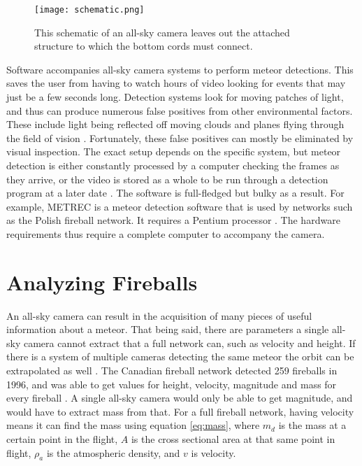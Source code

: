 \begin{figure}[ht!]
	\centering
	\texttt{[image: schematic.png]}
	\caption{This schematic of an all-sky camera leaves out the attached structure to which the bottom cords must connect\protect\cite{Bannister2012}.}
	\label{fig:schematic}
\end{figure}

Software accompanies all-sky camera systems to perform meteor detections. This saves the user from having to watch hours of video looking for events that may just be a few seconds long. Detection systems look for moving patches of light, and thus can produce numerous false positives from other environmental factors. These include light being reflected off moving clouds and planes flying through the field of vision \cite{Harbaugh2008}. Fortunately, these false positives can mostly be eliminated by visual inspection. The exact setup depends on the specific system, but meteor detection is either constantly processed by a computer checking the frames as they arrive, or the video is stored as a whole to be run through a detection program at a later date \cite{Molau2005}. The software is full-fledged but bulky as a result. For example, METREC is a meteor detection software that is used by networks such as the Polish fireball network. It requires a Pentium processor \cite{Molau2005}. The hardware requirements thus require a complete computer to accompany the camera.  

\section{Analyzing Fireballs}

An all-sky camera can result in the acquisition of many pieces of useful information about a meteor. That being said, there are parameters a single all-sky camera cannot extract that a full network can, such as velocity and height. If there is a system of multiple cameras detecting the same meteor the orbit can be extrapolated as well \cite{Trigo-Rodriguez2009}. The Canadian fireball network detected 259 fireballs in 1996, and was able to get values for height, velocity, magnitude and mass for every fireball \cite{Halliday1996}. A single all-sky camera would only be able to get magnitude, and would have to extract mass from that. For a full fireball network, having velocity means it can find the mass using equation \ref{eq:mass}, where $m_d$ is the mass at a certain point in the flight, $A$ is the cross sectional area at that same point in flight, $\rho_a$ is the atmospheric density, and $v$ is velocity.

